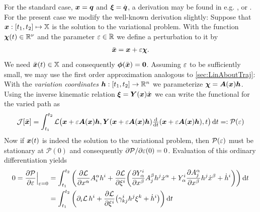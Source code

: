 For the standard case, $\sysCoord = \genCoord$ and $\sysVel = \genCoordd$, a derivation may be found in e.g. \cite[chap.\,4, §3]{CourantHilbert1}, \cite[ch.\,II]{Lanczos:Variational} or \cite[sec.\,12]{Arnold:MathematicalMethodsOfClassicalMechanics}.
For the present case we modify the well-known derivation slightly:
Suppose that $\sysCoord : [t_1, t_2] \mapsto \configSpace$ is the solution to the variational problem.
With the function $\varFkt(t) \in \RealNum^{\numCoord}$ and the parameter $\varParam\in\RealNum$ we define a perturbation to it by
\begin{align}
 \sysCoordB = \sysCoord + \varParam\varFkt.
\end{align}
We need $\sysCoordB(t) \in \configSpace$ and consequently $\geoConstraint(\sysCoordB)=\tuple{0}$.
Assuming $\varParam$ to be sufficiently small, we may use the first order approximation analogous to \autoref{sec:LinAboutTraj}:
With the \textit{variation coordinates} $\varCoord : [t_1,t_2] \rightarrow \RealNum^{\dimConfigSpace}$ we parameterize $\varFkt = \kinMat(\sysCoord)\varCoord$.
Using the inverse kinematic relation $\sysVel = \kinBasisMat(\sysCoord)\sysCoordd$ we can write the functional for the varied path as
\begin{align}
 \mathcal{J}[\sysCoordB] = \int_{t_1}^{t_2} \Lagrangian\big(\sysCoord + \varParam\kinMat(\sysCoord)\varCoord, \kinBasisMat(\sysCoord + \varParam\kinMat(\sysCoord)\varCoord) \tdiff{t}(\sysCoord + \varParam\kinMat(\sysCoord)\varCoord), t\big) \, \d t =: \mathcal{P}(\varParam)
\end{align}
Now if $\sysCoord(t)$ is indeed the solution to the variational problem, then $\mathcal{P}(\varParam)$ must be stationary at $\mathcal{P}(0)$ and consequently $\spdiff[\mathcal{P}]{\varParam}(0) = 0$.
Evaluation of this ordinary differentiation yields
\begin{align}
 0 = \pdiff[\mathcal{P}]{\varParam} \Big|_{\varParam=0} &= \int_{t_1}^{t_2} \bigg( \pdiff[\Lagrangian]{\sysCoordCoeff{\GidxI}} \kinMatCoeff{\GidxI}{\LidxI} \varCoordCoeff{\LidxI} + \pdiff[\Lagrangian]{\sysVelCoeff{\LidxI}} \bigg( \pdiff[\kinBasisMatCoeff{\LidxI}{\GidxI}]{\sysCoordCoeff{\GidxII}} \kinMatCoeff{\GidxII}{\LidxII} \varCoordCoeff{\LidxII} \sysCoordCoeffd{\GidxI} + \kinBasisMatCoeff{\LidxI}{\GidxI} \pdiff[\kinMatCoeff{\GidxI}{\LidxII}]{\sysCoordCoeff{\GidxII}} \varCoordCoeff{\LidxII} \sysCoordCoeffd{\GidxII} + \varCoordCoeffd{\LidxI}\bigg) \bigg) \, \d t
\nonumber\\
 &= \int_{t_1}^{t_2} \bigg( \dirDiff{\LidxI}\Lagrangian \, \varCoordCoeff{\LidxI} + \pdiff[\Lagrangian]{\sysVelCoeff{\LidxI}} \big( \BoltzSym{\LidxI}{\LidxIII}{\LidxII} \varCoordCoeff{\LidxII} \sysVelCoeff{\LidxIII} + \varCoordCoeffd{\LidxI} \big) \bigg) \, \d t
\end{align}
